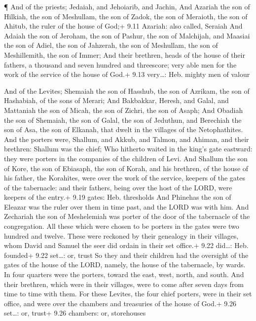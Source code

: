  ¶ And of the priests; Jedaiah, and Jehoiarib, and Jachin,
 And Azariah the son of Hilkiah, the son of Meshullam, the
son of Zadok, the son of Meraioth, the son of Ahitub, the ruler of the
house of God;+ 9.11 Azariah: also called, Seraiah  And
Adaiah the son of Jeroham, the son of Pashur, the son of Malchijah, and
Maasiai the son of Adiel, the son of Jahzerah, the son of Meshullam, the
son of Meshillemith, the son of Immer;  And their brethren,
heads of the house of their fathers, a thousand and seven hundred and
threescore; very able men for the work of the service of the house of
God.+ 9.13 very\ldots: Heb. mighty men of valour

 And of the Levites; Shemaiah the son of Hasshub, the son
of Azrikam, the son of Hashabiah, of the sons of Merari; 
And Bakbakkar, Heresh, and Galal, and Mattaniah the son of Micah, the
son of Zichri, the son of Asaph;  And Obadiah the son of
Shemaiah, the son of Galal, the son of Jeduthun, and Berechiah the son
of Asa, the son of Elkanah, that dwelt in the villages of the
Netophathites.  And the porters were, Shallum, and Akkub,
and Talmon, and Ahiman, and their brethren: Shallum was the chief;
 Who hitherto waited in the king's gate eastward: they were
porters in the companies of the children of Levi.  And
Shallum the son of Kore, the son of Ebiasaph, the son of Korah, and his
brethren, of the house of his father, the Korahites, were over the work
of the service, keepers of the gates of the tabernacle: and their
fathers, being over the host of the LORD, were keepers of the entry.+
9.19 gates: Heb. thresholds  And Phinehas the son of
Eleazar was the ruler over them in time past, and the LORD was with him.
 And Zechariah the son of Meshelemiah was porter of the
door of the tabernacle of the congregation.  All these
which were chosen to be porters in the gates were two hundred and
twelve. These were reckoned by their genealogy in their villages, whom
David and Samuel the seer did ordain in their set office.+ 9.22
did\ldots: Heb. founded+ 9.22 set\ldots: or, trust  So they
and their children had the oversight of the gates of the house of the
LORD, namely, the house of the tabernacle, by wards.  In
four quarters were the porters, toward the east, west, north, and south.
 And their brethren, which were in their villages, were to
come after seven days from time to time with them.  For
these Levites, the four chief porters, were in their set office, and
were over the chambers and treasuries of the house of God.+ 9.26
set\ldots: or, trust+ 9.26 chambers: or, storehouses

